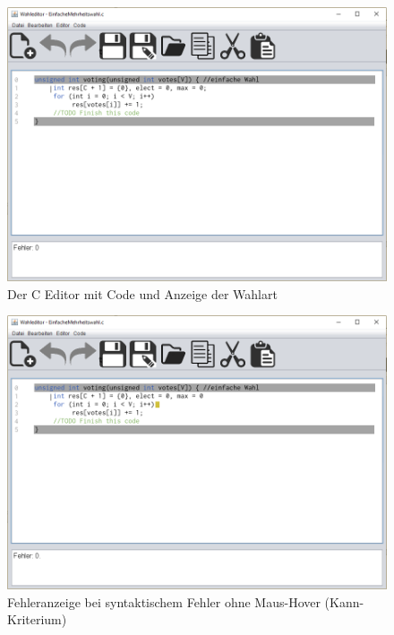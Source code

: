 \documentclass[a4paper]{scrreprt}
\begin{document}
\begin{figure}[H]
\includegraphics[scale=0.5]{Editor-mit-text.png}
\caption{Der C Editor mit Code und Anzeige der Wahlart}
\label{Editor-mit-text}
\end{figure}

\begin{figure}[H]
\includegraphics[scale=0.5]{Editor-mit-Fehler-ohne-hover.png}
\caption{Fehleranzeige bei syntaktischem Fehler ohne Maus-Hover (Kann-Kriterium)}
\label{Editor-mit-Fehler-ohne-hover}
\end{figure}
\end{document}
